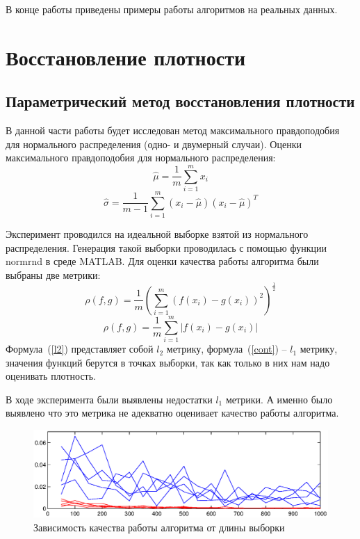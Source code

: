 \documentclass[10pt, a4paper]{article}
\begin{document}
В конце работы приведены примеры работы алгоритмов на реальных данных.

\newpage

\section{Восстановление плотности}
 
\subsection{Параметрический метод восстановления плотности}
В данной части работы будет исследован метод максимального правдоподобия для нормального распределения
(одно- и двумерный случаи).
Оценки максимального правдоподобия для нормального распределения:
$$
\hat \mu = \frac{1}{m}\sum_{i=1}^m x_i
$$
$$
\hat \sigma = \frac{1}{m-1}\sum_{i=1}^m \left(x_i-\hat \mu \right)\left(x_i-\hat \mu \right)^T
$$

Эксперимент проводился на идеальной выборке взятой из нормального распределения.
Генерация такой выборки проводилась с помощью функции normrnd в среде MATLAB.
Для оценки качества работы алгоритма были выбраны две метрики:
\begin{equation}
    \label{l2}
    \rho(f,g)=\frac{1}{m}\left(\sum_{i=1}^m\left(f(x_i)-g(x_i)\right)^2\right)^{\frac{1}{2}}
\end{equation}
\begin{equation}
    \label{cont}
    \rho(f,g)=\frac{1}{m}\sum_{i=1}^m\left|f(x_i)-g(x_i)\right|
\end{equation}
Формула~(\ref{l2}) представляет собой $l_2$ метрику, формула~(\ref{cont}) -- $l_1$ метрику, 
значения функций берутся в точках выборки, так как только в них нам надо оценивать плотность.

В ходе эксперимента были выявлены недостатки $l_1$ метрики. А именно было выявлено что это метрика не
адекватно оценивает качество работы алгоритма.
\nopagebreak[4]
\begin{figure}[h]
    \includegraphics[width=\textwidth]{mle_quality.eps}
    \caption{Зависимость качества работы алгоритма от длины выборки}
    \label{mle_quality}
\end{figure}
\nopagebreak[4]
\end{document}
